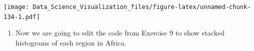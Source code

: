 \documentclass[
]{article}
\newenvironment{Shaded}{\begin{snugshade}}{\end{snugshade}}
\newcommand{\DataTypeTok}[1]{\textcolor[rgb]{0.13,0.29,0.53}{#1}}
\newcommand{\DecValTok}[1]{\textcolor[rgb]{0.00,0.00,0.81}{#1}}
\newcommand{\KeywordTok}[1]{\textcolor[rgb]{0.13,0.29,0.53}{\textbf{#1}}}
\newcommand{\NormalTok}[1]{#1}
\newcommand{\OperatorTok}[1]{\textcolor[rgb]{0.81,0.36,0.00}{\textbf{#1}}}
\newcommand{\StringTok}[1]{\textcolor[rgb]{0.31,0.60,0.02}{#1}}
\providecommand{\tightlist}{%
  \setlength{\itemsep}{0pt}\setlength{\parskip}{0pt}}
\begin{document}
\texttt{[image: Data\_Science\_Visualization\_files/figure-latex/unnamed-chunk-134-1.pdf]}

\begin{enumerate}
\def\labelenumi{\arabic{enumi}.}
\setcounter{enumi}{9}
\tightlist
\item
  Now we are going to edit the code from Exercise 9 to show stacked
  histograms of each region in Africa.
\end{enumerate}

\begin{Shaded}
\end{Shaded}
\end{document}
